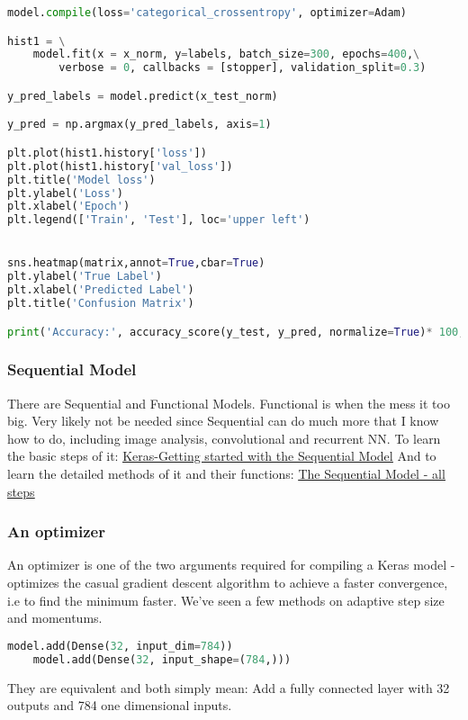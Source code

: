 \begin{lstlisting}[language = python]
model.compile(loss='categorical_crossentropy', optimizer=Adam)

hist1 = \
    model.fit(x = x_norm, y=labels, batch_size=300, epochs=400,\
        verbose = 0, callbacks = [stopper], validation_split=0.3)

y_pred_labels = model.predict(x_test_norm)

y_pred = np.argmax(y_pred_labels, axis=1)

plt.plot(hist1.history['loss'])
plt.plot(hist1.history['val_loss'])
plt.title('Model loss')
plt.ylabel('Loss')
plt.xlabel('Epoch')
plt.legend(['Train', 'Test'], loc='upper left')


sns.heatmap(matrix,annot=True,cbar=True)
plt.ylabel('True Label')
plt.xlabel('Predicted Label')
plt.title('Confusion Matrix')

print('Accuracy:', accuracy_score(y_test, y_pred, normalize=True)* 100, '%')
\end{lstlisting}

\subsubsection{Sequential Model}
There are Sequential and Functional Models. Functional is when the mess it too big. Very likely not be needed since Sequential can do much more that I know how to do, including image analysis, convolutional and recurrent NN.
To learn the basic steps of it:
\href{https://keras.io/getting-started/sequential-model-guide/}{\ul{Keras-Getting started with the Sequential Model}}
And to learn the detailed methods of it and their functions:
\href{https://keras.io/models/sequential/}{\ul{The Sequential Model - all steps}}

\subsubsection{An optimizer}

An optimizer is one of the two arguments required for compiling a Keras model - optimizes the casual gradient descent algorithm to achieve a faster convergence, i.e to find the minimum faster. We've seen a few methods on adaptive step size and momentums.
\begin{lstlisting}[language=python]
    model.add(Dense(32, input_dim=784))
    model.add(Dense(32, input_shape=(784,)))    
\end{lstlisting}

They are equivalent and both simply mean: Add a fully connected layer with 32 outputs and 784 one dimensional inputs.



